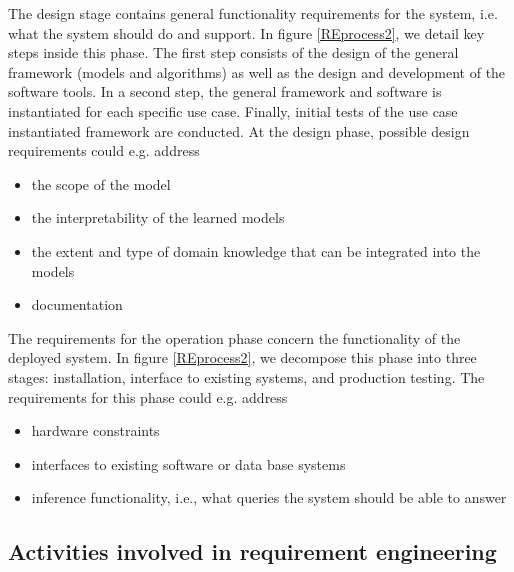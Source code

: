 \documentclass[11pt, oneside]{article}   	%
\begin{document}
The design stage contains general functionality requirements for the system, i.e. what the system should do and support.  In figure \ref{REprocess2}, we detail key steps inside this phase. The first step consists of the design of the general framework (models and algorithms) as well as the design and development of the software tools. In a second step, the general framework and software is instantiated for each specific use case. Finally, initial tests of the use case instantiated framework are conducted.  At the design phase, possible design requirements could e.g. address
\begin{itemize}
 \item the scope of the model
 \item the interpretability of the learned models
 \item the extent and type of domain knowledge that can be integrated into the models
 \item documentation
\end{itemize}

The requirements for the operation phase concern the functionality of the deployed system. In figure \ref{REprocess2}, we decompose this phase into three stages: installation, interface to existing systems, and production testing. The requirements for this phase could e.g. address
\begin{itemize}
 \item hardware constraints
 \item interfaces to existing software or data base systems
 \item inference functionality, i.e., what queries the system should be able to answer
\end{itemize}


\subsection{Activities involved in requirement engineering}
\end{document}
